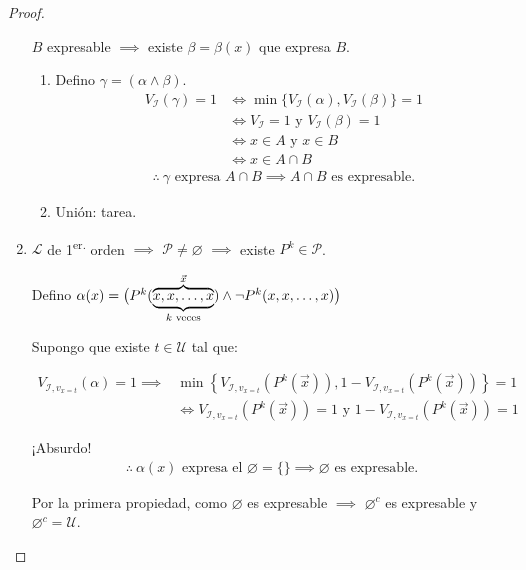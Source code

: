 \begin{proof}
\begin{enumerate}
            $B$ expresable $\implies$ existe $\beta=\beta(x)$ 
            que expresa $B$.
            \begin{enumerate}
                \item Defino $\gamma = (\alpha \wedge \beta)$.
                    \begin{align*}
                        V_{\mathcal{I}}(\gamma)=1 &\iff \min{\{ 
                        V_{\mathcal{I}}(\alpha), V_{\mathcal{I}}(\beta)\}}=1\\
                        &\iff V_{\mathcal{I}}=1 \text{ y }
                        V_{\mathcal{I}}(\beta)=1 \\
                        &\iff x \in A \text{ y } x \in B\\
                        &\iff x \in A \cap B
                    \end{align*}
                    \begin{gather*}
                        \therefore ~ \gamma \text{ expresa } A \cap B
                        \implies  A \cap B \text{ es expresable.}
                    \end{gather*}
                \item Unión: tarea. 
            \end{enumerate}

        \item $\mathcal{L}$ de 1\textsuperscript{er.} orden $\implies$
            $\mathcal{P} \neq \varnothing$ $\implies$ existe 
            $P^k \in \mathcal{P}$.

            Defino $\alpha(x) = \big(
                P^k ( \overbrace{%
                \underbrace{x,x,\dotsc,x}_{k\text{ veces}}}^{\vec{x}} )
                \wedge 
                \neg P^k (x, x, \dotsc,x) \big)$

            Supongo que existe $t \in \mathcal{U}$ tal que:

            \begin{align*}
                V_{\mathcal{I}, v_{x=t}}(\alpha)=1 \implies&
                \min{\left\{ V_{\mathcal{I}, v_{x=t}} \left(P^k(\vec{x})\right), 
                1 - V_{\mathcal{I}, v_{x=t}}\left(P^k(\vec{x})\right)
                \right\}} = 1 \\
                &\iff V_{\mathcal{I}, v_{x=t}} \left(P^k(\vec{x})\right)=1 
                \text{ y }
                1 - V_{\mathcal{I}, v_{x=t}}\left(P^k(\vec{x})\right) = 1
            \end{align*}

            ¡Absurdo!
            \begin{gather*}
                \therefore ~ \alpha(x) \text{ expresa el } \varnothing = \{\}
                \implies \varnothing \text{ es expresable.}
            \end{gather*}

            Por la primera propiedad, como $\varnothing$ es expresable
            $\implies$ $\varnothing^c$ es expresable y 
            $\varnothing^c=\mathcal{U}$.
    \end{enumerate}
\end{proof}

